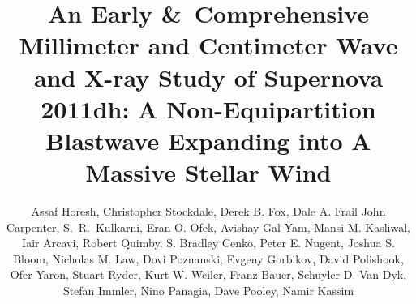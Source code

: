 \documentclass{emulateapj}
\begin{document}
 

\title{An Early  \&\ Comprehensive Millimeter and Centimeter Wave and X-ray Study of
  Supernova 2011dh: A Non-Equipartition Blastwave Expanding into A Massive Stellar Wind}


\author{
Assaf Horesh,
Christopher Stockdale,
Derek B. Fox, 
Dale A. Frail
John Carpenter, 
S.~R.~Kulkarni,
Eran O. Ofek,
Avishay Gal-Yam,
Mansi M. Kasliwal, 
Iair Arcavi,
Robert Quimby,
S. Bradley Cenko,
Peter E. Nugent,
Joshua S. Bloom,
Nicholas M. Law,
Dovi Poznanski,
Evgeny Gorbikov,
David Polishook,
Ofer Yaron,
Stuart Ryder,
Kurt W. Weiler,
Franz Bauer,
Schuyler D. Van Dyk,
Stefan Immler,
Nino Panagia,
Dave Pooley,
Namir Kassim
}
\end{document}

